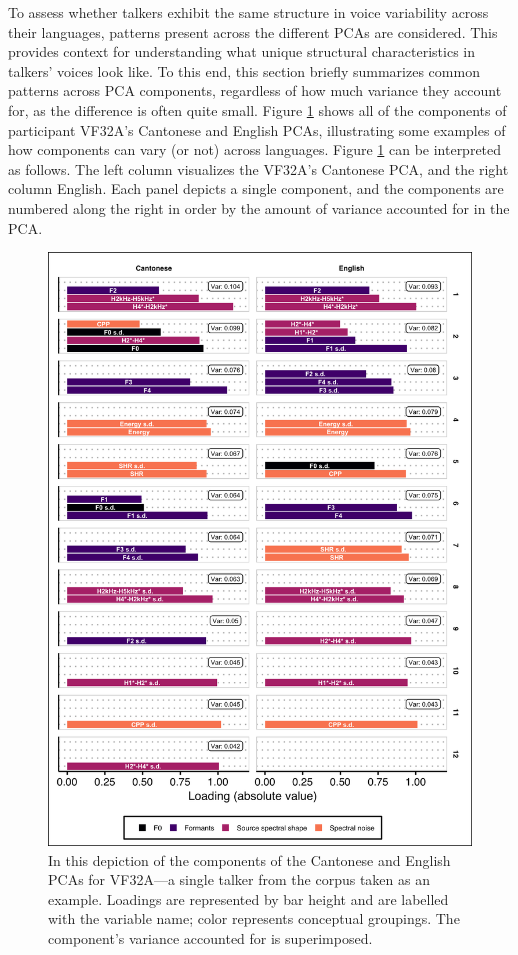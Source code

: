 To assess whether talkers exhibit the same structure in voice variability across their languages, patterns present across the different PCAs are considered. This provides context for understanding what unique structural characteristics in talkers' voices look like. To this end, this section briefly summarizes common patterns across PCA components, regardless of how much variance they account for, as the difference is often quite small. Figure \ref{ch3:fig:VF32A} shows all of the components of participant VF32A's Cantonese and English PCAs, illustrating some examples of how components can vary (or not) across languages. Figure \ref{ch3:fig:VF32A} can be interpreted as follows. The left column visualizes the VF32A's Cantonese PCA, and the right column English. Each panel depicts a single component, and the components are numbered along the right in order by the amount of variance accounted for in the PCA. 

\begin{figure}[ptbh]
\begin{center}
\includegraphics[width=0.8\linewidth]{figures/ch3_pca_vf32a_vert5in.png} 
\caption{In this depiction of the components of the Cantonese and English PCAs for VF32A---a single talker from the corpus taken as an example. Loadings are represented by bar height and are labelled with the variable name; color represents conceptual groupings. The component's variance accounted for is superimposed.}
\label{ch3:fig:VF32A}
\end{center}
\end{figure}


